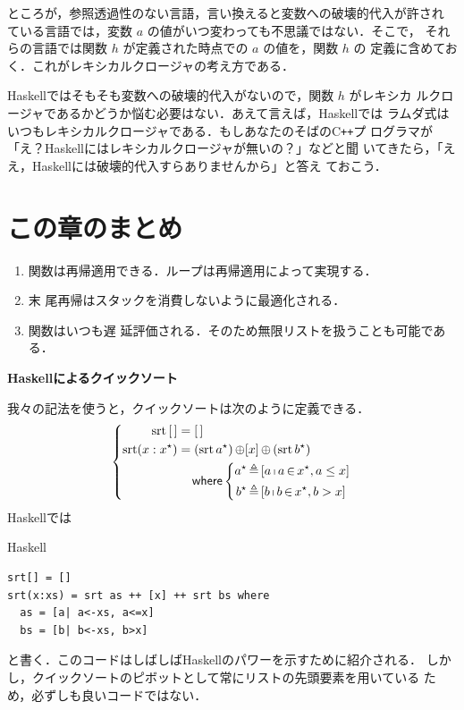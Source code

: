 \documentclass[a5paper,twoside,fleqn,draft]{jsbook}
\newcommand{\programminglanguage}[1]{\textsf{#1}}
\newcommand{\cxx}{\programminglanguage{C}\texttt{++}}
\newcommand{\haskell}{\programminglanguage{Haskell}}
\newenvironment{note}[1]{\begin{boxnote}\begin{center}\textbf{#1}\end{center}}{\end{boxnote}}
\newenvironment{haskellcode}{\begin{itembox}[r]{\haskell}}{\end{itembox}}
\newcommand{\mKeyword}[1]{\mathsf{#1}}
\newcommand{\mWhereKeyword}{\mKeyword{where}}
\DeclareMathOperator{\mWhere}{\mWhereKeyword}
\newcommand{\mEmptyList}{{[\,]}}
\newcommand{\mSpecialFunc}[1]{#1}
\DeclareMathOperator{\mSort}{\mSpecialFunc{srt}}
\DeclareMathOperator{\mAppend}{\oplus}
\DeclareMathOperator{\mFrom}{\in}
\DeclareMathOperator{\mLetEq}{\triangleq}
\newcommand{\mList}[1]{{#1}^\mathrm{\star}}
\DeclareMathOperator{\mListComp}{\shortmid}
\begin{document}
ところが，参照透過性のない言語，言い換えると変数への破壊的代入が許され
ている言語では，変数 $a$ の値がいつ変わっても不思議ではない．そこで，
それらの言語では関数 $h$ が定義された時点での $a$ の値を，関数 $h$ の
定義に含めておく．これがレキシカルクロージャの考え方である．

\haskell ではそもそも変数への破壊的代入がないので，関数 $h$ がレキシカ
ルクロージャであるかどうか悩む必要はない．あえて言えば，\haskell では
ラムダ式はいつもレキシカルクロージャである．もしあなたのそばの\cxx プ
ログラマが「え？\haskell にはレキシカルクロージャが無いの？」などと聞
いてきたら，「ええ，\haskell には破壊的代入すらありませんから」と答え
ておこう．

\section{この章のまとめ}

\begin{enumerate}
\item 関数は再帰適用できる．ループは再帰適用によって実現する．\item 末
  尾再帰はスタックを消費しないように最適化される．\item 関数はいつも遅
  延評価される．そのため無限リストを扱うことも可能である．
\end{enumerate}

\begin{note}{\haskell によるクイックソート}
我々の記法を使うと，クイックソートは次のように定義できる．
\begin{equation*}
  \left\{
  \begin{aligned}
    \mSort\mEmptyList
    &=\mEmptyList\\
    \mSort(x:\mList{x})
    &=(\mSort\mList{a})\mAppend[x]\mAppend{}(\mSort\mList{b})\\
    &\quad\mWhere\left\{\begin{aligned}
    \mList{a}&\mLetEq{}[a\mListComp a\mFrom\mList{x},a\le x]\\
    \mList{b}&\mLetEq{}[b\mListComp b\mFrom\mList{x},b>x]
    \end{aligned}
    \right.
  \end{aligned}
  \right.
\end{equation*}
\haskell では %
\begin{haskellcode}
\begin{verbatim}
srt[] = []
srt(x:xs) = srt as ++ [x] ++ srt bs where
  as = [a| a<-xs, a<=x]
  bs = [b| b<-xs, b>x]
\end{verbatim}
\end{haskellcode}
と書く．このコードはしばしば\haskell のパワーを示すために紹介される．
しかし，クイックソートのピボットとして常にリストの先頭要素を用いている
ため，必ずしも良いコードではない．
\end{note}
\end{document}
